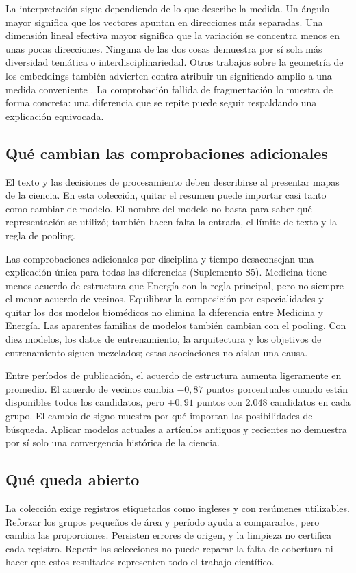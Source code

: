 La interpretación sigue dependiendo de lo que describe la medida. Un ángulo mayor significa que los vectores apuntan en direcciones más separadas. Una dimensión lineal efectiva mayor significa que la variación se concentra menos en unas pocas direcciones. Ninguna de las dos cosas demuestra por sí sola más diversidad temática o interdisciplinariedad. Otros trabajos sobre la geometría de los embeddings también advierten contra atribuir un significado amplio a una medida conveniente \citep{rudman-etal-2022-isoscore}. La comprobación fallida de fragmentación lo muestra de forma concreta: una diferencia que se repite puede seguir respaldando una explicación equivocada.

\subsection{Qué cambian las comprobaciones adicionales}
El texto y las decisiones de procesamiento deben describirse al presentar mapas de la ciencia. En esta colección, quitar el resumen puede importar casi tanto como cambiar de modelo. El nombre del modelo no basta para saber qué representación se utilizó; también hacen falta la entrada, el límite de texto y la regla de pooling.

Las comprobaciones adicionales por disciplina y tiempo desaconsejan una explicación única para todas las diferencias (Suplemento S5). Medicina tiene menos acuerdo de estructura que Energía con la regla principal, pero no siempre el menor acuerdo de vecinos. Equilibrar la composición por especialidades y quitar los dos modelos biomédicos no elimina la diferencia entre Medicina y Energía. Las aparentes familias de modelos también cambian con el pooling. Con diez modelos, los datos de entrenamiento, la arquitectura y los objetivos de entrenamiento siguen mezclados; estas asociaciones no aíslan una causa.

Entre períodos de publicación, el acuerdo de estructura aumenta ligeramente en promedio. El acuerdo de vecinos cambia $-0,87$ puntos porcentuales cuando están disponibles todos los candidatos, pero $+0,91$ puntos con 2.048 candidatos en cada grupo. El cambio de signo muestra por qué importan las posibilidades de búsqueda. Aplicar modelos actuales a artículos antiguos y recientes no demuestra por sí solo una convergencia histórica de la ciencia.

\subsection{Qué queda abierto}
La colección exige registros etiquetados como ingleses y con resúmenes utilizables. Reforzar los grupos pequeños de área y período ayuda a compararlos, pero cambia las proporciones. Persisten errores de origen, y la limpieza no certifica cada registro. Repetir las selecciones no puede reparar la falta de cobertura ni hacer que estos resultados representen todo el trabajo científico.

